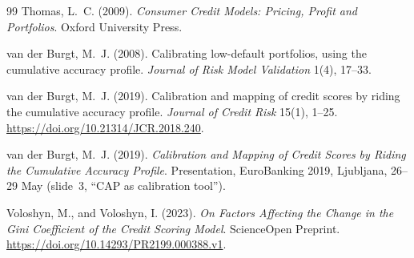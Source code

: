 \documentclass[12pt]{article}
\begin{document}
\begin{thebibliography}{99}
 Thomas, L.~C. (2009). \emph{Consumer Credit Models: Pricing, Profit and
Portfolios}. Oxford University Press.

 van der Burgt, M.~J. (2008). Calibrating low-default portfolios, using the
cumulative accuracy profile. \emph{Journal of Risk Model Validation} 1(4), 17--33.

 van der Burgt, M.~J. (2019). Calibration and mapping of credit scores by
riding the cumulative accuracy profile. \emph{Journal of Credit Risk} 15(1), 1--25.
\url{https://doi.org/10.21314/JCR.2018.240}.

 van der Burgt, M.~J. (2019). \emph{Calibration and Mapping of Credit
Scores by Riding the Cumulative Accuracy Profile}. Presentation, EuroBanking 2019, Ljubljana,
26--29 May (slide~3, ``CAP as calibration tool'').

 Voloshyn, M., and Voloshyn, I. (2023). \emph{On Factors Affecting the
Change in the Gini Coefficient of the Credit Scoring Model}. ScienceOpen Preprint.
\url{https://doi.org/10.14293/PR2199.000388.v1}.

\end{thebibliography}
\end{document}
